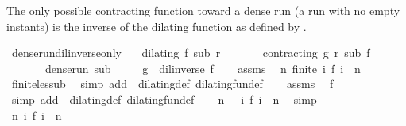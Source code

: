 \begin{isabellebody}
%
\isadelimproof
%
\endisadelimproof
%
\begin{isamarkuptext}%
The only possible contracting function toward a dense run (a run with no empty 
  instants) is the inverse of the dilating function as defined by 
  .%
\end{isamarkuptext}\isamarkuptrue%
\isamarkupfalse%
\ dense{\isacharunderscore}run{\isacharunderscore}dil{\isacharunderscore}inverse{\isacharunderscore}only{\isacharcolon}\isanewline
\ \ \ {\isacartoucheopen}dilating\ f\ sub\ r{\isacartoucheclose}\isanewline
\ \ \ \ \ \ \ {\isacartoucheopen}contracting\ g\ r\ sub\ f{\isacartoucheclose}\isanewline
\ \ \ \ \ \ \ {\isacartoucheopen}dense{\isacharunderscore}run\ sub{\isacartoucheclose}\isanewline
\ \ \ \ \ {\isacartoucheopen}g\ {\isacharequal}\ {\isacharparenleft}dil{\isacharunderscore}inverse\ f{\isacharparenright}{\isacartoucheclose}\isanewline
%
\isadelimproof
%
\endisadelimproof
%
\isatagproof
{}\isamarkupfalse%
\isanewline
\ \ \isamarkupfalse%
\ assms{\isacharparenleft}{}{\isacharparenright}\ \isamarkupfalse%
\ {\isacharasterisk}{\isacharcolon}{\isacartoucheopen}{\isasymAnd}n{\isachardot}\ finite\ {\isacharbraceleft}i{\isachardot}\ f\ i\ {\isasymle}\ n{\isacharbraceright}{\isacartoucheclose}\isanewline
\ \ \ \ \isamarkupfalse%
\ finite{\isacharunderscore}less{\isacharunderscore}ub\ \isamarkupfalse%
\ {\isacharparenleft}simp\ add{\isacharcolon}\ \ dilating{\isacharunderscore}def\ dilating{\isacharunderscore}fun{\isacharunderscore}def{\isacharparenright}\isanewline
\ \ \isamarkupfalse%
\ assms{\isacharparenleft}{}{\isacharparenright}\ \isamarkupfalse%
\ {\isacartoucheopen}f\ {}\ {\isacharequal}\ {}{\isacartoucheclose}\ \isamarkupfalse%
\ {\isacharparenleft}simp\ add{\isacharcolon}\ \ dilating{\isacharunderscore}def\ dilating{\isacharunderscore}fun{\isacharunderscore}def{\isacharparenright}\isanewline
\ \ \isamarkupfalse%
\ {\isacartoucheopen}{\isasymAnd}n{\isachardot}\ {}\ {\isasymin}\ {\isacharbraceleft}i{\isachardot}\ f\ i\ {\isasymle}\ n{\isacharbraceright}{\isacartoucheclose}\ \isamarkupfalse%
\ simp\isanewline
\ \ \isamarkupfalse%
\ {\isacharasterisk}{\isacharasterisk}{\isacharcolon}{\isacartoucheopen}{\isasymAnd}n{\isachardot}\ {\isacharbraceleft}i{\isachardot}\ f\ i\ {\isasymle}\ n{\isacharbraceright}\ {\isasymnoteq}\ {\isacharbraceleft}{\isacharbraceright}{\isacartoucheclose}\ \isamarkupfalse%

\end{isabellebody}

